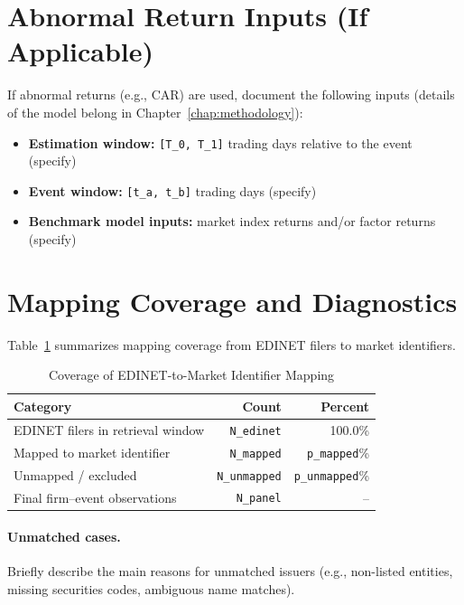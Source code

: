 \section{Abnormal Return Inputs (If Applicable)}
\label{appendix:abnormal_inputs}

If abnormal returns (e.g., CAR) are used, document the following inputs (details of the model belong in Chapter~\ref{chap:methodology}):

\begin{itemize}
  \item \textbf{Estimation window:} \texttt{[T\_0, T\_1]} trading days relative to the event (specify)
  \item \textbf{Event window:} \texttt{[t\_a, t\_b]} trading days (specify)
  \item \textbf{Benchmark model inputs:} market index returns and/or factor returns (specify)
\end{itemize}

\section{Mapping Coverage and Diagnostics}
\label{appendix:mapping_diagnostics}

Table~\ref{tab:mapping_coverage} summarizes mapping coverage from EDINET filers to market identifiers.

\begin{table}[h]
\centering
\caption{Coverage of EDINET-to-Market Identifier Mapping}
\label{tab:mapping_coverage}
\begin{tabular}{lrr}
\toprule
\textbf{Category} & \textbf{Count} & \textbf{Percent} \\
\midrule
EDINET filers in retrieval window & \texttt{N\_edinet} & 100.0\% \\
Mapped to market identifier & \texttt{N\_mapped} & \texttt{p\_mapped}\% \\
Unmapped / excluded & \texttt{N\_unmapped} & \texttt{p\_unmapped}\% \\
Final firm--event observations & \texttt{N\_panel} & -- \\
\bottomrule
\end{tabular}
\end{table}

\paragraph{Unmatched cases.}
Briefly describe the main reasons for unmatched issuers (e.g., non-listed entities, missing securities codes, ambiguous name matches).

